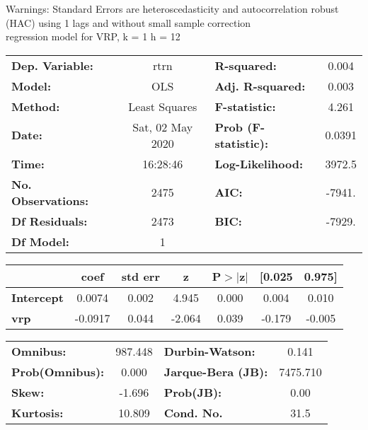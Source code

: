 Warnings: \newline
 [1] Standard Errors are heteroscedasticity and autocorrelation robust (HAC) using 1 lags and without small sample correction\\ 

regression model for VRP, k = 1 h = 12\begin{center}
\begin{tabular}{lclc}
\toprule
\textbf{Dep. Variable:}    &       rtrn       & \textbf{  R-squared:         } &     0.004   \\
\textbf{Model:}            &       OLS        & \textbf{  Adj. R-squared:    } &     0.003   \\
\textbf{Method:}           &  Least Squares   & \textbf{  F-statistic:       } &     4.261   \\
\textbf{Date:}             & Sat, 02 May 2020 & \textbf{  Prob (F-statistic):} &   0.0391    \\
\textbf{Time:}             &     16:28:46     & \textbf{  Log-Likelihood:    } &    3972.5   \\
\textbf{No. Observations:} &        2475      & \textbf{  AIC:               } &    -7941.   \\
\textbf{Df Residuals:}     &        2473      & \textbf{  BIC:               } &    -7929.   \\
\textbf{Df Model:}         &           1      & \textbf{                     } &             \\
\bottomrule
\end{tabular}
\begin{tabular}{lcccccc}
                   & \textbf{coef} & \textbf{std err} & \textbf{z} & \textbf{P$> |$z$|$} & \textbf{[0.025} & \textbf{0.975]}  \\
\midrule
\textbf{Intercept} &       0.0074  &        0.002     &     4.945  &         0.000        &        0.004    &        0.010     \\
\textbf{vrp}       &      -0.0917  &        0.044     &    -2.064  &         0.039        &       -0.179    &       -0.005     \\
\bottomrule
\end{tabular}
\begin{tabular}{lclc}
\textbf{Omnibus:}       & 987.448 & \textbf{  Durbin-Watson:     } &    0.141  \\
\textbf{Prob(Omnibus):} &   0.000 & \textbf{  Jarque-Bera (JB):  } & 7475.710  \\
\textbf{Skew:}          &  -1.696 & \textbf{  Prob(JB):          } &     0.00  \\
\textbf{Kurtosis:}      &  10.809 & \textbf{  Cond. No.          } &     31.5  \\
\bottomrule
\end{tabular}
\end{center}

